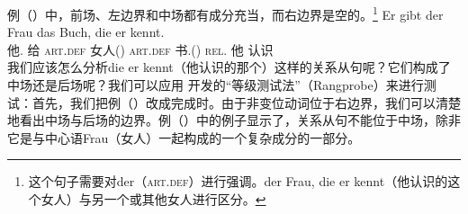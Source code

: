 例（）中，前场、左边界和中场都有成分充当，而右边界是空的。\footnote{%
这个句子需要对der（\textsc{art}.\textsc{def}）进行强调。der Frau, die er kennt（他认识的这个女人）与另一个或其他女人进行区分。}
\ea
\gll Er        gibt  der         Frau      das           Buch,    die er kennt.\\
     他.\mas{} 给    \textsc{art}.\textsc{def} 女人(\fem) \textsc{art}.\textsc{def} 书.(\neu) \textsc{rel}.\fem{} 他 认识\\
\z 
我们应该怎么分析die er
kennt（他认识的那个）这样的关系从句呢？它们构成了中场还是后场呢？我们可以应用 \citet[]{Bech55a}开发的“等级测试法”（Rangprobe）来进行测试：首先，我们把例（）改成完成时。由于非变位动词位于右边界，我们可以清楚地看出中场与后场的边界。例（）中的例子显示了，关系从句不能位于中场，除非它是与中心语Frau（女人）一起构成的一个复杂成分的一部分。
\eal
{}
\zl

